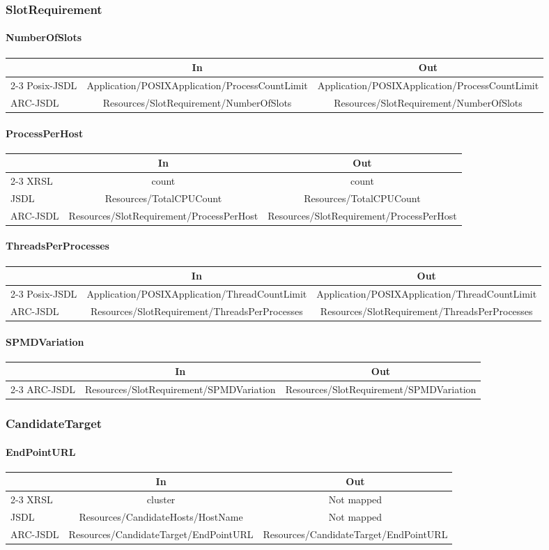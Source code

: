 \documentclass{article}
\newcommand{\NM}{\normalsize{\textnormal{Not mapped}}}
\newcommand{\subsubsubsection}[1]{\paragraph{#1}}
\newenvironment{inouttabular}%
{\begin{center}\begin{tabular}{l>{\ttfamily\footnotesize}c>{\ttfamily\footnotesize}c}%
\toprule
& \textnormal{\normalsize{In}} & \textnormal{\normalsize{Out}}\\ \cmidrule{2-3}}
{\bottomrule\end{tabular}\end{center}}
\begin{document}
\subsubsection{SlotRequirement}
\subsubsubsection{NumberOfSlots}
\begin{inouttabular}
Posix-JSDL & Application/POSIXApplication/ProcessCountLimit & Application/POSIXApplication/ProcessCountLimit\\
ARC-JSDL & Resources/SlotRequirement/NumberOfSlots & Resources/SlotRequirement/NumberOfSlots\\
\end{inouttabular}

\subsubsubsection{ProcessPerHost}
\begin{inouttabular}
XRSL & count & count\\
JSDL & Resources/TotalCPUCount & Resources/TotalCPUCount\\
ARC-JSDL & Resources/SlotRequirement/ProcessPerHost & Resources/SlotRequirement/ProcessPerHost\\
\end{inouttabular}

\subsubsubsection{ThreadsPerProcesses}
\begin{inouttabular}
Posix-JSDL & Application/POSIXApplication/ThreadCountLimit & Application/POSIXApplication/ThreadCountLimit\\
ARC-JSDL & Resources/SlotRequirement/ThreadsPerProcesses & Resources/SlotRequirement/ThreadsPerProcesses\\
\end{inouttabular}

\subsubsubsection{SPMDVariation}
\begin{inouttabular}
ARC-JSDL & Resources/SlotRequirement/SPMDVariation & Resources/SlotRequirement/SPMDVariation\\
\end{inouttabular}

\subsubsection{CandidateTarget}
\subsubsubsection{EndPointURL}
\begin{inouttabular}
XRSL & cluster & \NM\\
JSDL & Resources/CandidateHosts/HostName & \NM\\
ARC-JSDL & Resources/CandidateTarget/EndPointURL & Resources/CandidateTarget/EndPointURL\\
\end{inouttabular}
\end{document}
